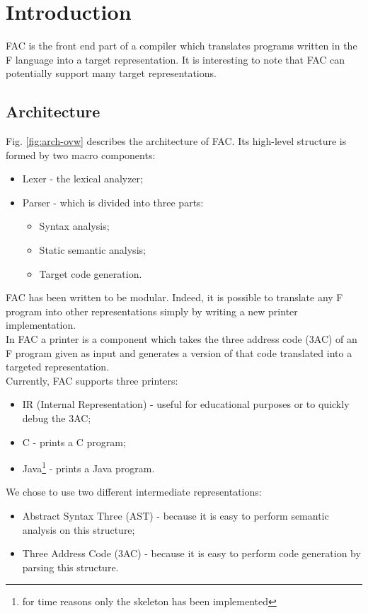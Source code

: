 \section*{Introduction}

FAC is the front end part of a compiler which translates programs written in the
F language into a target representation. It is interesting to note that FAC can
potentially support many target representations.

\subsection*{Architecture}
Fig. \ref{fig:arch-ovw} describes the architecture of FAC.
Its high-level structure is formed by two macro components:
\begin{itemize}
\item Lexer - the lexical analyzer;
\item Parser - which is divided into three parts:
\begin{itemize}
	\item Syntax analysis;
	\item Static semantic analysis;
	\item Target code generation.
\end{itemize}
\end{itemize}

FAC has been written to be modular. Indeed, it is possible to translate any F
program into other representations simply by writing a new printer implementation.
\\
In FAC a printer is a component which takes the three address code (3AC) of an F
program given as input and generates a version of that code translated into a targeted
representation.
\\
Currently, FAC supports three printers:
\begin{itemize}
\item IR (Internal Representation) - useful for educational purposes or to quickly debug the 3AC;
\item C - prints a C program;
\item Java\footnote{for time reasons only the skeleton has been implemented} - prints a Java program.
\end{itemize}

We chose to use two different intermediate representations:
\begin{itemize}
\item Abstract Syntax Three (AST) - because it is easy to perform semantic analysis on this structure;
\item Three Address Code (3AC) - because it is easy to perform code generation by parsing this structure.
\end{itemize}

